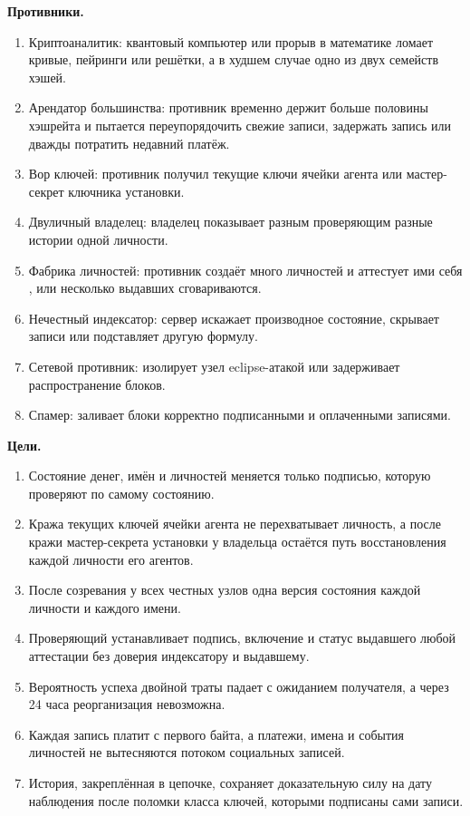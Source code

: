 \documentclass[10pt,a4paper]{article}
\begin{document}
\textbf{Противники.}
\begin{enumerate}[label=П\arabic*.]
\item Криптоаналитик: квантовый компьютер или прорыв в математике ломает кривые, пейринги или решётки, а в худшем случае одно из двух семейств хэшей.
\item Арендатор большинства: противник временно держит больше половины хэшрейта и пытается переупорядочить свежие записи, задержать запись или дважды потратить недавний платёж.
\item Вор ключей: противник получил текущие ключи ячейки агента или мастер-секрет ключника установки.
\item Двуличный владелец: владелец показывает разным проверяющим разные истории одной личности.
\item Фабрика личностей: противник создаёт много личностей и аттестует ими себя \cite{sybil}, или несколько выдавших сговариваются.
\item Нечестный индексатор: сервер искажает производное состояние, скрывает записи или подставляет другую формулу.
\item Сетевой противник: изолирует узел eclipse-атакой \cite{eclipse} или задерживает распространение блоков.
\item Спамер: заливает блоки корректно подписанными и оплаченными записями.
\end{enumerate}

\textbf{Цели.}
\begin{enumerate}[label=Ц\arabic*.]
\item Состояние денег, имён и личностей меняется только подписью, которую проверяют по самому состоянию.
\item Кража текущих ключей ячейки агента не перехватывает личность, а после кражи мастер-секрета установки у владельца остаётся путь восстановления каждой личности его агентов.
\item После созревания у всех честных узлов одна версия состояния каждой личности и каждого имени.
\item Проверяющий устанавливает подпись, включение и статус выдавшего любой аттестации без доверия индексатору и выдавшему.
\item Вероятность успеха двойной траты падает с ожиданием получателя, а через 24 часа реорганизация невозможна.
\item Каждая запись платит с первого байта, а платежи, имена и события личностей не вытесняются потоком социальных записей.
\item История, закреплённая в цепочке, сохраняет доказательную силу на дату наблюдения после поломки класса ключей, которыми подписаны сами записи.
\end{enumerate}
\end{document}
